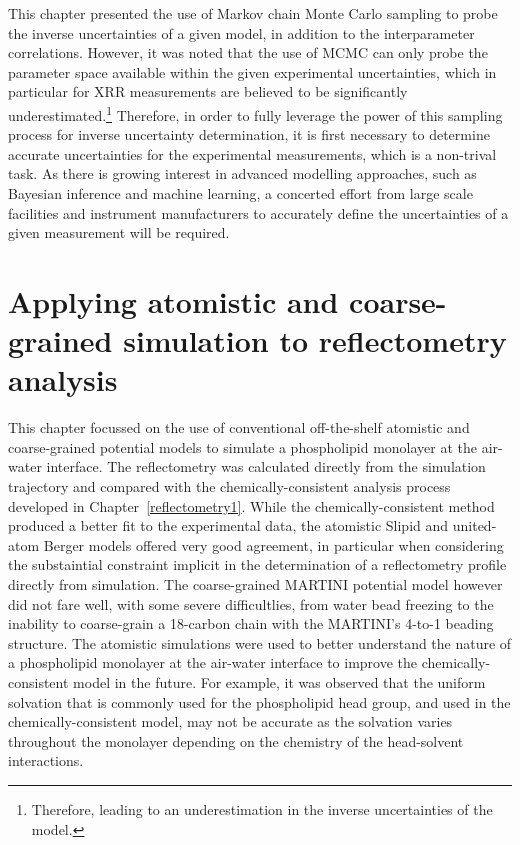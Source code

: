 This chapter presented the use of Markov chain Monte Carlo sampling to probe the inverse uncertainties of a given model, in addition to the interparameter correlations.
However, it was noted that the use of MCMC can only probe the parameter space available within the given experimental uncertainties, which in particular for XRR measurements are believed to be significantly underestimated.\footnote{Therefore, leading to an underestimation in the inverse uncertainties of the model.}
Therefore, in order to fully leverage the power of this sampling process for inverse uncertainty determination, it is first necessary to determine accurate uncertainties for the experimental measurements, which is a non-trival task.
As there is growing interest in advanced modelling approaches, such as Bayesian inference and machine learning, a concerted effort from large scale facilities and instrument manufacturers to accurately define the uncertainties of a given measurement will be required.

\section{Applying atomistic and coarse-grained simulation to reflectometry analysis}
This chapter focussed on the use of conventional off-the-shelf atomistic and coarse-grained potential models to simulate a phospholipid monolayer at the air-water interface.
The reflectometry was calculated directly from the simulation trajectory and compared with the chemically-consistent analysis process developed in Chapter~\ref{reflectometry1}.
While the chemically-consistent method produced a better fit to the experimental data, the atomistic Slipid and united-atom Berger models offered very good agreement, in particular when considering the substaintial constraint implicit in the determination of a reflectometry profile directly from simulation.
The coarse-grained MARTINI potential model however did not fare well, with some severe difficultlies, from water bead freezing to the inability to coarse-grain a 18-carbon chain with the MARTINI's 4-to-1 beading structure.
The atomistic simulations were used to better understand the nature of a phospholipid monolayer at the air-water interface to improve the chemically-consistent model in the future.
For example, it was observed that the uniform solvation that is commonly used for the phospholipid head group, and used in the chemically-consistent model, may not be accurate as the solvation varies throughout the monolayer depending on the chemistry of the head-solvent interactions.

